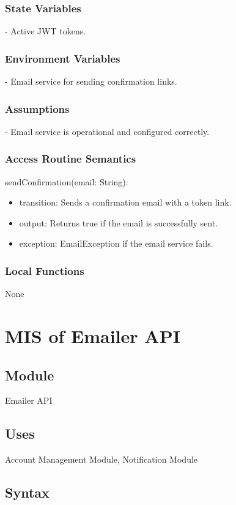 \documentclass[12pt, titlepage]{article}
\begin{document}
\subsubsection{State Variables}
- Active JWT tokens.

\subsubsection{Environment Variables}
- Email service for sending confirmation links.

\subsubsection{Assumptions}
- Email service is operational and configured correctly.

\subsubsection{Access Routine Semantics}
\noindent sendConfirmation(email: String):
\begin{itemize}
\item transition: Sends a confirmation email with a token link.
\item output: Returns true if the email is successfully sent.
\item exception: EmailException if the email service fails.
\end{itemize}

\subsubsection{Local Functions}
None

\section{MIS of Emailer API} \label{EmailerAPI}

\subsection{Module}
Emailer API

\subsection{Uses}
Account Management Module, Notification Module

\subsection{Syntax}
\end{document}
